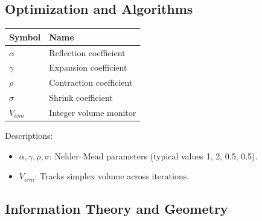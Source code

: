 \documentclass[
  10pt,
]{article}
\newcounter{none} %
\providecommand{\tightlist}{%
  \setlength{\itemsep}{0pt}\setlength{\parskip}{0pt}}
\begin{document}
\subsection{Optimization and
Algorithms}\label{optimization-and-algorithms}

{\def\LTcaptype{none} %
\begin{longtable}[]{@{}ll@{}}
\toprule\noalign{}
Symbol & Name \\
\midrule\noalign{}
\endhead
\bottomrule\noalign{}
\endlastfoot
\(\alpha\) & Reflection coefficient \\
\(\gamma\) & Expansion coefficient \\
\(\rho\) & Contraction coefficient \\
\(\sigma\) & Shrink coefficient \\
\(V_{ivm}\) & Integer volume monitor \\
\end{longtable}
}

Descriptions:

\begin{itemize}
\tightlist
\item
  \(\alpha,\gamma,\rho,\sigma\): Nelder--Mead parameters (typical values
  1, 2, 0.5, 0.5).
\item
  \(V_{ivm}\): Tracks simplex volume across iterations.
\end{itemize}

\subsection{Information Theory and
Geometry}\label{information-theory-and-geometry}
\end{document}
